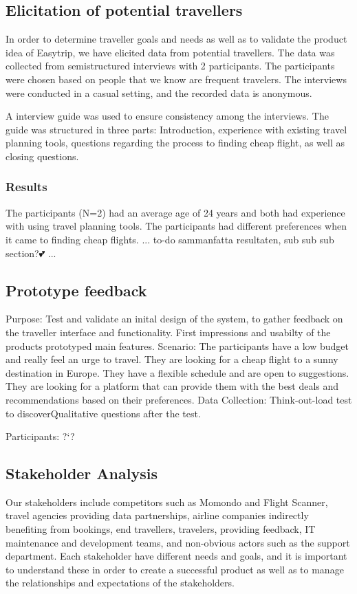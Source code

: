 \subsection{Elicitation of potential travellers}
In order to determine traveller goals and needs as well as to validate the product idea of Easytrip, we have elicited data from potential travellers. The data was collected from semistructured interviews with 2 participants. The participants were chosen based on people that we know are frequent travelers. The interviews were conducted in a casual setting, and the recorded data is anonymous.

A interview guide was used to ensure consistency among the interviews. The guide was structured in three parts: Introduction, experience with existing travel planning tools, questions regarding the process to finding cheap flight, as well as closing questions. 

\subsubsection{Results}
The participants (N=2) had an average age of 24 years and both had experience with using travel planning tools. The participants had different preferences when it came to finding cheap flights. 
... to-do sammanfatta resultaten, sub sub sub section?💕 ...

\subsection{Prototype feedback}
Purpose: Test and validate an inital design of the system, to gather feedback on the traveller interface and functionality. First impressions and usabilty of the products prototyped main features.
Scenario: The participants have a low budget and really feel an urge to travel. They are looking for a cheap flight to a sunny destination in Europe. They have a flexible schedule and are open to suggestions. They are looking for a platform that can provide them with the best deals and recommendations based on their preferences.
Data Collection: Think-out-load test to discoverQualitative questions after the test.

Participants: ?`?

\subsection{Stakeholder Analysis}
Our stakeholders include competitors such as Momondo and Flight Scanner, travel agencies providing data partnerships, airline companies indirectly benefiting from bookings, end travellers, travelers, providing feedback, IT maintenance and development teams, and non-obvious actors such as the support department. Each stakeholder have different needs and goals, and it is important to understand these in order to create a successful product as well as to manage the relationships and expectations of the stakeholders.

